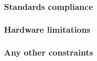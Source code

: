\subsubsection{Standards compliance}
\subsubsection{Hardware limitations}
\subsubsection{Any other constraints}
